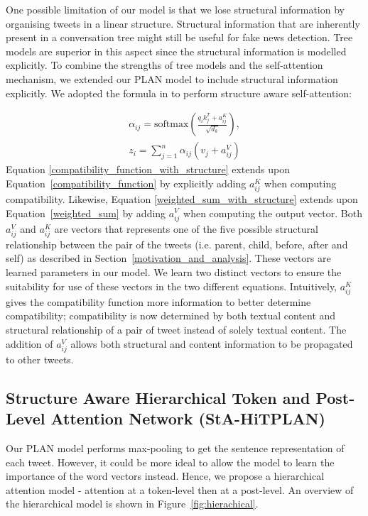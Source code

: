 \documentclass[letterpaper]{article} %
\begin{document}
One possible limitation of our model is that we lose structural information by organising tweets in a linear structure. Structural information that are inherently present in a conversation tree might still be useful for fake news detection. Tree models are superior in this aspect since the structural information is modelled explicitly. To combine the strengths of tree models and the self-attention mechanism, we extended our PLAN model to include structural information explicitly. We adopted the formula in \citet{shaw-etal-2018-self} to perform structure aware self-attention:

\begin{eqnarray}
\alpha_{ij} = \mathrm{softmax}(\frac{q_{i}k_{j}^T + a_{ij}^K}{\sqrt{d_{k}}}) \label{compatibility_function_with_structure}, \\
z_i = \sum_{j=1}^{n} \alpha_{ij} (v_j + a_{ij}^V) \label{weighted_sum_with_structure}
\end{eqnarray} 
Equation \ref{compatibility_function_with_structure} extends upon Equation~\ref{compatibility_function} by explicitly adding $a_{ij}^K$ when computing compatibility. Likewise, Equation \ref{weighted_sum_with_structure} extends upon Equation~\ref{weighted_sum} by adding $a_{ij}^V$ when computing the output vector.
Both $a_{ij}^V$ and $a_{ij}^K$ are vectors that represents one of the five possible structural relationship between the pair of the tweets (i.e. parent, child, before, after and self) as described in Section~\ref{motivation_and_analysis}. These vectors are learned parameters in our model. We learn two distinct vectors to ensure the suitability for use of these vectors in the two different equations.
Intuitively, $a_{ij}^K$ gives the compatibility function more information to better determine compatibility; compatibility is now determined by both textual content and structural relationship of a pair of tweet instead of solely textual content. The addition of $a_{ij}^V$ allows both structural and content information to be propagated to other tweets. 

\subsection{Structure Aware Hierarchical Token and Post-Level Attention Network (StA-HiTPLAN)}
\label{sec:stahitplan}
Our PLAN model performs max-pooling to get the sentence representation of each tweet. However, it could be more ideal to allow the model to learn the importance of the word vectors instead. Hence, we propose a hierarchical attention model - attention at a token-level then at a post-level. An overview of the hierarchical model is shown in Figure~\ref{fig:hierachical}.
\end{document}
